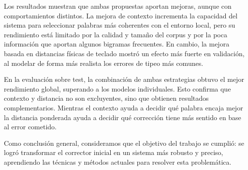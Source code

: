 \documentclass[12pt,a4paper]{article}
\begin{document}
Los resultados muestran que ambas propuestas aportan mejoras, aunque con 
comportamientos distintos. La mejora de contexto incrementa la capacidad 
del sistema para seleccionar palabras más coherentes con el entorno local, 
pero su rendimiento está limitado por la calidad y tamaño del corpus y por la poca 
información que aportan algunos bigramas frecuentes. En cambio, la mejora 
basada en distancias físicas de teclado mostró un efecto más fuerte en 
validación, al modelar de forma más realista los errores de tipeo más comunes.

En la evaluación sobre test, la combinación de ambas estrategias obtuvo el 
mejor rendimiento global, superando a los modelos individuales. Esto 
confirma que contexto y distancia no son excluyentes, sino que obtienen resultados 
complementarios. Mientras el contexto ayuda a decidir qué palabra encaja 
mejor la distancia ponderada ayuda a decidir qué corrección tiene más sentido 
en base al error cometido.

Como conclusión general, consideramos que el objetivo del trabajo se 
cumplió: se logró transformar el corrector inicial en un sistema más 
robusto y preciso, aprendiendo las técnicas y métodos actuales para resolver
esta problemática. 
\end{document}
